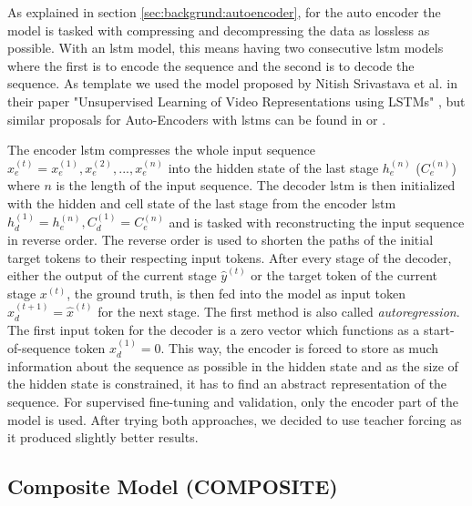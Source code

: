 As explained in section \ref{sec:backgrund:autoencoder}, for the auto encoder the model is tasked with compressing and decompressing the data as lossless as possible. With an \gls{lstm} model, this means having two consecutive \gls{lstm} models where the first is to encode the sequence and the second is to decode the sequence. As template we used the model proposed by Nitish Srivastava et al. in their paper "Unsupervised Learning of Video Representations using LSTMs" \cite{unsupervised_learning_lstms}, but similar proposals for Auto-Encoders with \glspl{lstm} can be found in \cite{unsupervised_learning_lstms_timeseries} or \cite{lstm_anomaly_detection}. \par
The encoder \gls{lstm} compresses the whole input sequence $x_e^{(t)} = x_e^{(1)}, x_e^{(2)}, ..., x_e^{(n)}$ into the hidden state of the last stage $h_e^{(n)}$ ($C_e^{(n)}$) where $n$ is the length of the input sequence. The decoder \gls{lstm} is then initialized with the hidden and cell state of the last stage from the encoder \gls{lstm} $h_d^{(1)} = h_e^{(n)}, C_d^{(1)} = C_e^{(n)}$ and is tasked with reconstructing the input sequence in reverse order. The reverse order is used to shorten the paths of the initial target tokens to their respecting input tokens. After every stage of the decoder, either the output of the current stage $\hat{y}^{(t)}$ or the target token of the current stage $x^{(t)}$, the ground truth, is then fed into the model as input token $x_d^{(t+1)} = \hat{x}^{(t)}$ for the next stage. The first method is also called \textit{autoregression}. The first input token for the decoder is a zero vector which functions as a start-of-sequence token $x_d^{(1)} = 0$. This way, the encoder is forced to store as much information about the sequence as possible in the hidden state and as the size of the hidden state is constrained, it has to find an abstract representation of the sequence. For supervised fine-tuning and validation, only the encoder part of the model is used. After trying both approaches, we decided to use teacher forcing as it produced slightly better results.

\subsection{Composite Model (COMPOSITE)} \label{sec:experiments:lstm:composite}

